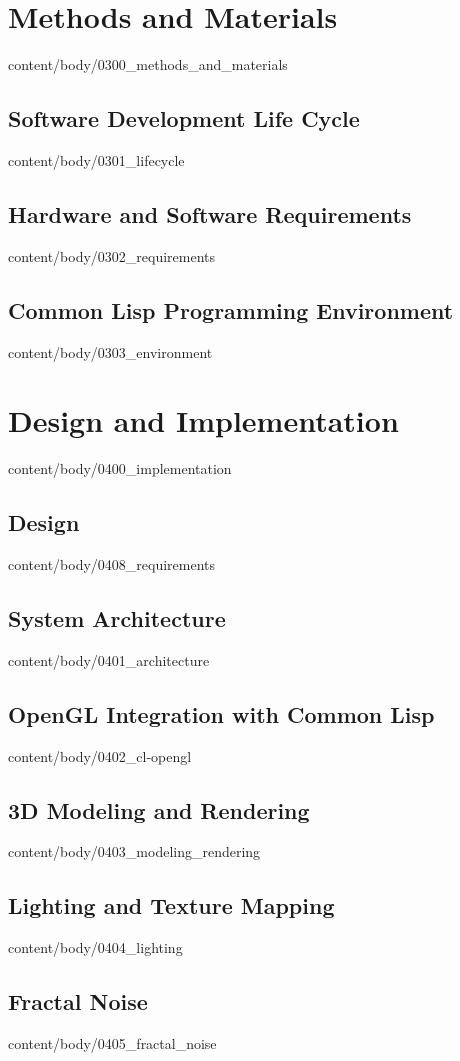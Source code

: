 \documentclass[english, tfg, loc, lof, firstnumbered, epsbased]{tfgtfmthesisuam}
\begin{document}
\chapter{Methods and Materials}{content/body/0300_methods_and_materials}            %
  \section{Software Development Life Cycle}{content/body/0301_lifecycle}            %
  \section{Hardware and Software Requirements}{content/body/0302_requirements}      %
  \section{Common Lisp Programming Environment}{content/body/0303_environment}      %

\chapter{Design and Implementation}{content/body/0400_implementation}               %
  \section{Design}{content/body/0408_requirements}                      %
  \section{System Architecture}{content/body/0401_architecture}                     %
  \section{OpenGL Integration with Common Lisp}{content/body/0402_cl-opengl}        %
  \section{3D Modeling and Rendering}{content/body/0403_modeling_rendering}         %
  \section{Lighting and Texture Mapping}{content/body/0404_lighting}                %
  \section{Fractal Noise}{content/body/0405_fractal_noise}                          %
\end{document}
